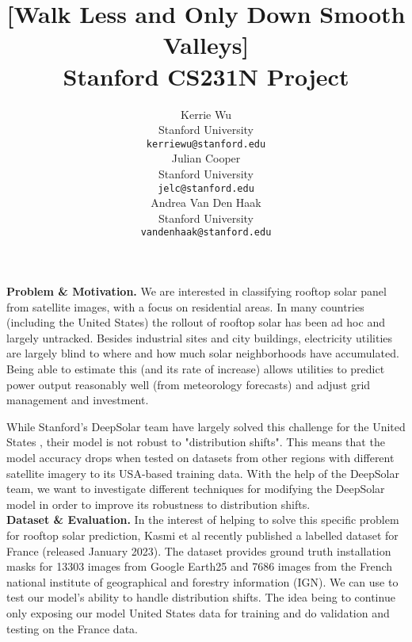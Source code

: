\documentclass{article}
\title{
  [Walk Less and Only Down Smooth Valleys] \\
  \vspace{0.15cm}
  {\normalfont Stanford CS231N Project}  %
}
\author{
  Kerrie Wu \\
  Stanford University \\
  \texttt{kerriewu@stanford.edu} \\
   \And
    Julian Cooper \\
  Stanford University \\
  \texttt{jelc@stanford.edu} \\
   \And
   Andrea Van Den Haak \\
  Stanford University \\
  \texttt{vandenhaak@stanford.edu} \\
}
\newcommand{\note}[1]{\textcolor{blue}{{#1}}}
\begin{document}
\maketitle



\textbf{Problem \& Motivation.}
We are interested in classifying rooftop solar panel from satellite images, with a focus on residential areas. In many countries (including the United States) the rollout of rooftop solar has been ad hoc and largely untracked. Besides industrial sites and city buildings, electricity utilities are largely blind to where and how much solar neighborhoods have accumulated. Being able to estimate this (and its rate of increase) allows utilities to predict power output reasonably well (from meteorology forecasts) and adjust grid management and investment.

While Stanford's DeepSolar team have largely solved this challenge for the United States \cite{DeepSolar1} \cite{DeepSolar2}, their model is not robust to "distribution shifts". This means that the model accuracy drops when tested on datasets from other regions with different satellite imagery to its USA-based training data. With the help of the DeepSolar team, we want to investigate different techniques for modifying the DeepSolar model in order to improve its robustness to distribution shifts. \\

\textbf{Dataset \& Evaluation.}
In the interest of helping to solve this specific problem for rooftop solar prediction, Kasmi et al \cite{Kasmi2023} recently published a labelled dataset for France (released January 2023). The dataset provides ground truth installation masks for 13303 images from Google Earth25 and 7686 images from the French national institute of geographical and forestry information (IGN). We can use to test our model's ability to handle distribution shifts. The idea being to continue only exposing our model United States data for training and do validation and testing on the France data. \\
\end{document}
